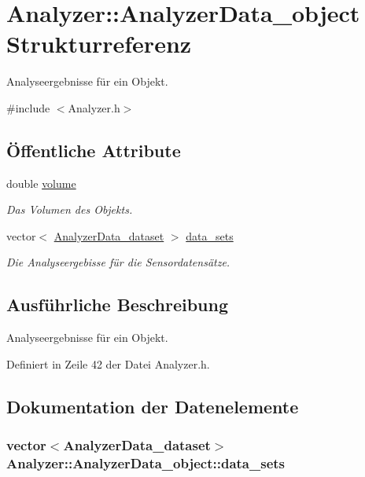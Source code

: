 \hypertarget{structAnalyzer_1_1AnalyzerData__object}{\section{Analyzer\-:\-:Analyzer\-Data\-\_\-object Strukturreferenz}
\label{structAnalyzer_1_1AnalyzerData__object}
}


Analyseergebnisse für ein Objekt.  




{\ttfamily \#include $<$Analyzer.\-h$>$}

\subsection*{Öffentliche Attribute}
\begin{DoxyCompactItemize}
\item 
double \hyperlink{structAnalyzer_1_1AnalyzerData__object_a78ddeb311ff702e110fc1d483d826920}{volume}
\begin{DoxyCompactList}\small\item\em Das Volumen des Objekts. \end{DoxyCompactList}\item 
vector$<$ \hyperlink{structAnalyzer_1_1AnalyzerData__dataset}{Analyzer\-Data\-\_\-dataset} $>$ \hyperlink{structAnalyzer_1_1AnalyzerData__object_a5d36dcf805f37b0e29134236e3881fca}{data\-\_\-sets}
\begin{DoxyCompactList}\small\item\em Die Analyseergebisse für die Sensordatensätze. \end{DoxyCompactList}\end{DoxyCompactItemize}


\subsection{Ausführliche Beschreibung}
Analyseergebnisse für ein Objekt. 

Definiert in Zeile 42 der Datei Analyzer.\-h.



\subsection{Dokumentation der Datenelemente}
\hypertarget{structAnalyzer_1_1AnalyzerData__object_a5d36dcf805f37b0e29134236e3881fca}{
\subsubsection[{data\-\_\-sets}]{\setlength{\rightskip}{0pt plus 5cm}vector$<${\bf Analyzer\-Data\-\_\-dataset}$>$ Analyzer\-::\-Analyzer\-Data\-\_\-object\-::data\-\_\-sets}}\label{structAnalyzer_1_1AnalyzerData__object_a5d36dcf805f37b0e29134236e3881fca}


